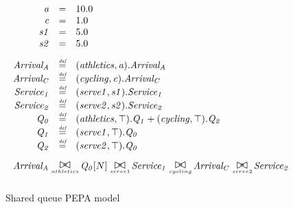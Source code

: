 \begin{figure}
	\caption{Shared queue PEPA model}
	\label{figure:pepa_queue_model}
	\centering
	\begin{displaymath}
		\begin{array}{rcl}
			\mathit{a} & = & 10.0\\
			\mathit{c} & = & 1.0\\
			\mathit{s1} & = & 5.0\\
			\mathit{s2} & = & 5.0\\
			[2.0ex]		\mathit{Arrival_A} & \rmdef & (\mathit{athletics},\mathit{a}).\mathit{Arrival_A}\\
			\mathit{Arrival_C} & \rmdef & (\mathit{cycling},\mathit{c}).\mathit{Arrival_C}\\
			\mathit{Service_1} & \rmdef & (\mathit{serve1},\mathit{s1}).\mathit{Service_1}\\
			\mathit{Service_2} & \rmdef & (\mathit{serve2},\mathit{s2}).\mathit{Service_2}\\
			\mathit{Q_0} & \rmdef & (\mathit{athletics},\top).\mathit{Q_1}+(\mathit{cycling},\top).\mathit{Q_2}\\
			\mathit{Q_1} & \rmdef & (\mathit{serve1},\top).\mathit{Q_0}\\
			\mathit{Q_2} & \rmdef & (\mathit{serve2},\top).\mathit{Q_0}\\
			[2.0ex]		\multicolumn{3}{l}{\mathit{Arrival_A}\sync{athletics}\mathit{Q_0}[N]\sync{serve1}\mathit{Service_1}\sync{cycling}\mathit{Arrival_C}\sync{serve2}\mathit{Service_2}}\\
			[2.0ex]	\end{array}
	\end{displaymath}
\end{figure}

